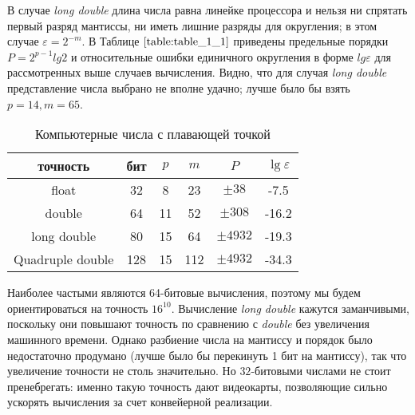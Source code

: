 В случае \textit{long double} длина числа равна линейке процессора и нельзя ни
спрятать первый разряд мантиссы, ни иметь лишние разряды для округления; в
этом случае $\varepsilon = 2^{-m}$. В Таблице $\ref{table:table_1_1}$ приведены предельные порядки $P = 2^{p-1}lg2$ и
относительные ошибки единичного округления в форме $lg\varepsilon$ для
рассмотренных выше случаев вычисления. Видно, что для случая \textit{long double}
представление числа выбрано не вполне удачно; лучше было бы взять $p = 14,m = 65$.

\begin{table}
\caption{Компьютерные числа с плавающей точкой}
\begin{center}
\begin{tabular}{|c|c|c|c|c|c|}
\hline
точность & бит & $p$ & $m$ & $P$ & $\lg \varepsilon$ \\
\hline
float & 32 & 8 & 23 & $\pm 38$ & -7.5 \\
double & 64 &  11 & 52 & $\pm 308$ & -16.2 \\
long double & 80 & 15 & 64 & $\pm 4932$ & -19.3\\
Quadruple double & 128 & 15 & 112 & $\pm 4932$ & -34.3 \\
\hline
\end{tabular}
\end{center}
\label{table:table_1_1}
\end{table}

Наиболее частыми являются 64-битовые вычисления, поэтому мы будем
ориентироваться на точность $16^{10}$. Вычисление \textit{long double} кажутся
заманчивыми, поскольку они повышают точность по сравнению с \textit{double} без
увеличения машинного времени. Однако разбиение числа на мантиссу и
порядок было недостаточно продумано (лучше было бы перекинуть 1 бит на
мантиссу), так что увеличение точности не столь значительно. Но $32$-битовыми
числами не стоит пренебрегать: именно такую точность дают видеокарты,
позволяющие сильно ускорять вычисления за счет конвейерной реализации.
